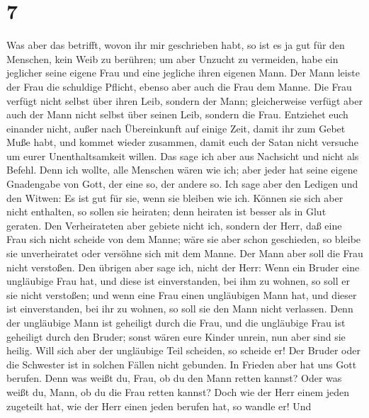\hypertarget{section-6}{%
\section{7}\label{section-6}}

 Was aber das betrifft, wovon ihr mir geschrieben habt, so
ist es ja gut für den Menschen, kein Weib zu berühren;  um
aber Unzucht zu vermeiden, habe ein jeglicher seine eigene Frau und eine
jegliche ihren eigenen Mann.  Der Mann leiste der Frau die
schuldige Pflicht, ebenso aber auch die Frau dem Manne. 
Die Frau verfügt nicht selbst über ihren Leib, sondern der Mann;
gleicherweise verfügt aber auch der Mann nicht selbst über seinen Leib,
sondern die Frau.  Entziehet euch einander nicht, außer
nach Übereinkunft auf einige Zeit, damit ihr zum Gebet Muße habt, und
kommet wieder zusammen, damit euch der Satan nicht versuche um eurer
Unenthaltsamkeit willen.  Das sage ich aber aus Nachsicht
und nicht als Befehl.  Denn ich wollte, alle Menschen
wären wie ich; aber jeder hat seine eigene Gnadengabe von Gott, der eine
so, der andere so.  Ich sage aber den Ledigen und den
Witwen: Es ist gut für sie, wenn sie bleiben wie ich. 
Können sie sich aber nicht enthalten, so sollen sie heiraten; denn
heiraten ist besser als in Glut geraten.  Den
Verheirateten aber gebiete nicht ich, sondern der Herr, daß eine Frau
sich nicht scheide von dem Manne;  wäre sie aber schon
geschieden, so bleibe sie unverheiratet oder versöhne sich mit dem
Manne. Der Mann aber soll die Frau nicht verstoßen.  Den
übrigen aber sage ich, nicht der Herr: Wenn ein Bruder eine ungläubige
Frau hat, und diese ist einverstanden, bei ihm zu wohnen, so soll er sie
nicht verstoßen;  und wenn eine Frau einen ungläubigen
Mann hat, und dieser ist einverstanden, bei ihr zu wohnen, so soll sie
den Mann nicht verlassen.  Denn der ungläubige Mann ist
geheiligt durch die Frau, und die ungläubige Frau ist geheiligt durch
den Bruder; sonst wären eure Kinder unrein, nun aber sind sie heilig.
 Will sich aber der ungläubige Teil scheiden, so scheide
er! Der Bruder oder die Schwester ist in solchen Fällen nicht gebunden.
In Frieden aber hat uns Gott berufen.  Denn was weißt du,
Frau, ob du den Mann retten kannst? Oder was weißt du, Mann, ob du die
Frau retten kannst?  Doch wie der Herr einem jeden
zugeteilt hat, wie der Herr einen jeden berufen hat, so wandle er! Und
